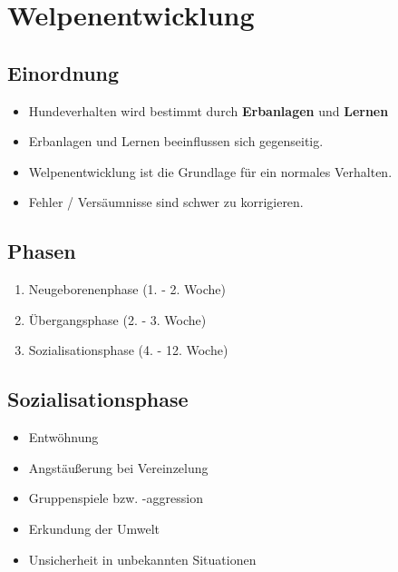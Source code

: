 \section{Welpenentwicklung}

    \subsection{Einordnung}
        \begin{itemize}
            \item Hundeverhalten wird bestimmt durch \textbf{Erbanlagen} und \textbf{Lernen}
            \item Erbanlagen und Lernen beeinflussen sich gegenseitig.
        \end{itemize}

        \begin{itemize}
            \item Welpenentwicklung ist die Grundlage für ein normales Verhalten.
            \item Fehler / Versäumnisse sind schwer zu korrigieren.
        \end{itemize}

    \subsection{Phasen}
        \begin{enumerate}
            \item Neugeborenenphase (1. - 2. Woche)
            \item Übergangsphase (2. - 3. Woche)
            \item Sozialisationsphase (4. - 12. Woche)
        \end{enumerate}

    \subsection{Sozialisationsphase}
        \begin{itemize}
            \item Entwöhnung
            \item Angstäußerung bei Vereinzelung
            \item Gruppenspiele bzw. -aggression
            \item Erkundung der Umwelt
            \item Unsicherheit in unbekannten Situationen
        \end{itemize}

